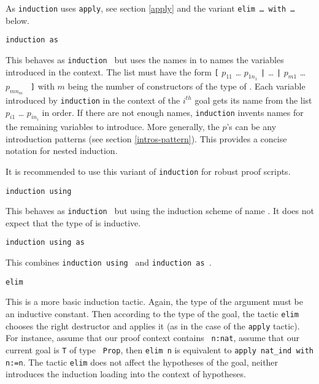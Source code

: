 \begin{ErrMsgs}
\item {}
\item {}
  
  As {\tt induction} uses {\tt apply}, see section \ref{apply} and
  the variant {\tt elim \dots\ with \dots} below.
\end{ErrMsgs}

\begin{Variants}
\item{\tt induction {\term} as {\pattern}}

  This behaves as {\tt induction {\term}} but uses the names in
  {\pattern} to names the variables introduced in the context. The
  list {\pattern} must have the form {\tt [} $p_{11}$ \ldots
  $p_{1n_1}$ {\tt |} {\ldots} {\tt |} $p_{m1}$ \ldots $p_{mn_m}$ {\tt
  ]} with $m$ being the number of constructors of the type of
  {\term}. Each variable introduced by {\tt induction} in the context of
  the $i^{th}$ goal gets its name from the list $p_{i1}$ \ldots
  $p_{in_i}$ in order. If there are not enough names, {\tt induction}
  invents names for the remaining variables to introduce. More
  generally, the $p$'s can be any introduction patterns (see section
  \ref{intros-pattern}). This provides a concise notation for nested
  induction.

  It is recommended to use this variant of {\tt induction} for 
  robust proof scripts.

\item {\tt induction {\term} using {\qualid}}

  This behaves as {\tt induction {\term}} but using the induction
scheme of name {\qualid}. It does not expect that the type of
{\term} is inductive.

\item {\tt induction {\term} using {\qualid} as {\pattern}}

  This combines {\tt induction {\term} using {\qualid}}
and {\tt induction {\term} as {\pattern}}.

\item {\tt elim \term}\label{elim}
  
  This is a more basic induction tactic.  Again, the type of the
  argument {\term} must be an inductive constant. Then according to
  the type of the goal, the tactic {\tt elim} chooses the right
  destructor and applies it (as in the case of the {\tt apply}
  tactic). For instance, assume that our proof context contains {\tt
    n:nat}, assume that our current goal is {\tt T} of type {\tt
    Prop}, then {\tt elim n} is equivalent to {\tt apply nat\_ind with
    n:=n}.  The tactic {\tt elim} does not affect the hypotheses of
  the goal, neither introduces the induction loading into the context
  of hypotheses.


\end{Variants}
